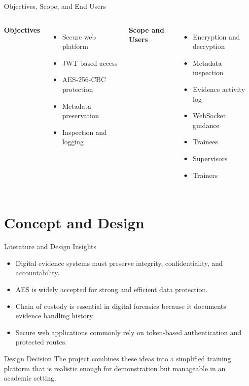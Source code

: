 \documentclass[aspectratio=169]{beamer}
\begin{document}
\begin{frame}{Objectives, Scope, and End Users}
    \begin{columns}[T]
        \textbf{Objectives}
        \begin{itemize}
            \item Secure web platform
            \item JWT-based access
            \item AES-256-CBC protection
            \item Metadata preservation
            \item Inspection and logging
        \end{itemize}

        \textbf{Scope and Users}
        \begin{itemize}
            \item Encryption and decryption
            \item Metadata inspection
            \item Evidence activity log
            \item WebSocket guidance
            \item Trainees
            \item Supervisors
            \item Trainers
        \end{itemize}
    \end{columns}
\end{frame}

\section{Concept and Design}

\begin{frame}{Literature and Design Insights}
    \begin{itemize}
        \item Digital evidence systems must preserve integrity, confidentiality, and accountability.
        \item AES is widely accepted for strong and efficient data protection.
        \item Chain of custody is essential in digital forensics because it documents evidence handling history.
        \item Secure web applications commonly rely on token-based authentication and protected routes.
    \end{itemize}

    \begin{block}{Design Decision}
        The project combines these ideas into a simplified training platform that is realistic enough for demonstration but manageable in an academic setting.
    \end{block}
\end{frame}
\end{document}
